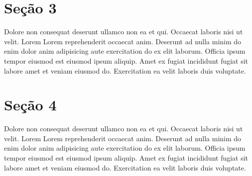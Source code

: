 \documentclass[12pt]{report}
\begin{document}
\newpage

\section{Seção 3}

Dolore non consequat deserunt ullamco non ea et qui. Occaecat laboris nisi ut velit. Lorem Lorem reprehenderit occaecat anim. Deserunt ad nulla minim do enim dolor anim adipisicing aute exercitation do ex elit laborum. Officia ipsum tempor eiusmod est eiusmod ipsum aliquip. Amet ex fugiat incididunt fugiat sit labore amet et veniam eiusmod do. Exercitation ea velit laboris duis voluptate.

\section{Seção 4}

Dolore non consequat deserunt ullamco non ea et qui. Occaecat laboris nisi ut velit. Lorem Lorem reprehenderit occaecat anim. Deserunt ad nulla minim do enim dolor anim adipisicing aute exercitation do ex elit laborum. Officia ipsum tempor eiusmod est eiusmod ipsum aliquip. Amet ex fugiat incididunt fugiat sit labore amet et veniam eiusmod do. Exercitation ea velit laboris duis voluptate. 
\end{document}
